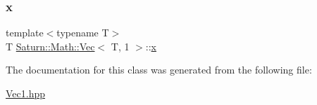\subsubsection{\texorpdfstring{x}{x}}
{\footnotesize\ttfamily template$<$typename T$>$ \\
T \mbox{\hyperlink{class_saturn_1_1_math_1_1_vec}{Saturn\+::\+Math\+::\+Vec}}$<$ T, 1 $>$\+::\mbox{\hyperlink{glad_8h_a3dddca64560508b8d5bd9ee938e2d3a3}{x}}}



The documentation for this class was generated from the following file\+:\begin{DoxyCompactItemize}
\item 
\mbox{\hyperlink{_vec1_8hpp}{Vec1.\+hpp}}\end{DoxyCompactItemize}
